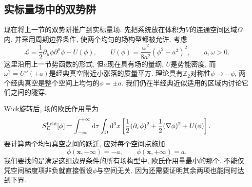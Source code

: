 
\subsection{实标量场中的双势阱}
现在将上一节的双势阱推广到实标量场. 先把系统放在体积为$V$的连通空间区域$\Omega$内, 并采用周期边界条件, 使两个均匀的场构型都被允许. 考虑
\begin{equation}
    \mathcal L=\frac12\partial_\mu\phi\partial^\mu\phi-U(\phi),
    \qquad U(\phi)=\frac{\omega^2}{8a^2}(\phi^2-a^2)^2,
    \qquad a,\omega>0.
\end{equation}
这里沿用上一节势函数的形式, 但$a$现在具有场的量纲, $U$是势能密度, 而$\omega^2=U''(\pm a)$是经典真空附近小涨落的质量平方. 理论具有$\mathbb Z_2$对称性$\phi\to-\phi$, 两个经典真空是整个空间上均匀的$\phi=\pm a$. 我们仍在半经典近似适用的区域内讨论它们之间的隧穿.

Wick旋转后, 场的欧氏作用量为
\begin{equation}\label{ssb-field-euclidean-action}
    S_E^{\mathrm{field}}[\phi]
    =\int_{-\infty}^{+\infty}\mathrm d\tau\int_\Omega\mathrm d^3x
      \left[\frac12(\partial_\tau\phi)^2
      +\frac12(\nabla\phi)^2+U(\phi)\right].
\end{equation}
要计算两个均匀真空之间的跃迁, 应对每个空间点施加
\begin{equation}\label{ssb-field-instanton-boundary}
    \phi(\mathbf x,-\infty)=-a,\qquad
    \phi(\mathbf x,+\infty)=a.
\end{equation}
我们要找的是满足这组边界条件的所有场构型中, 欧氏作用量最小的那个. 不能仅凭空间梯度项非负就直接假设$\phi$与空间无关, 因为还需要证明其余两项也能同时达到下界.

